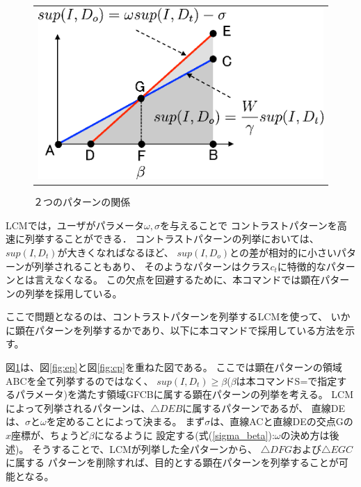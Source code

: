 \documentclass[a4paper]{jarticle}
\begin{document}
\begin{figure}[htbp]
\begin{center}
\begin{tabular}{c}
\begin{minipage}{0.3\hsize}
\begin{center}
\includegraphics[scale=0.5]{./epcp.eps}
\caption{２つのパターンの関係\label{fig:epcp}}
\end{center}
\end{minipage}


\end{tabular} 
\end{center}
\end{figure} 

LCMでは，ユーザがパラメータ$\omega, \sigma$を与えることで
コントラストパターンを高速に列挙することができる．
コントラストパターンの列挙においては、$sup(I,D_t)$が大きくなればなるほど、
$sup(I,D_o)$との差が相対的に小さいパターンが列挙されることもあり、
そのようなパターンはクラス$c_t$に特徴的なパターンとは言えなくなる。
この欠点を回避するために、本コマンドでは顕在パターンの列挙を採用している。

ここで問題となるのは、コントラストパターンを列挙するLCMを使って、
いかに顕在パターンを列挙するかであり、以下に本コマンドで採用している方法を示す。

図\ref{fig:epcp}は、図\ref{fig:ep}と図\ref{fig:cp}を重ねた図である。
ここでは顕在パターンの領域ABCを全て列挙するのではなく、
$sup(I,D_t)\ge\beta$($\beta$は本コマンドS=で指定するパラメータ)を満たす領域GFCBに属する顕在パターンの列挙を考える。
LCMによって列挙されるパターンは、$\triangle{DEB}$に属するパターンであるが、
直線DEは、$\sigma$と$\omega$を定めることによって決まる。
まず$\sigma$は、直線ACと直線DEの交点Gの$x$座標が、ちょうど$\beta$になるように
設定する(式(\ref{sigma_beta}):$\omega$の決め方は後述)。
そうすることで、LCMが列挙した全パターンから、
$\triangle{DFG}$および$\triangle{EGC}$に属する
パターンを削除すれば、目的とする顕在パターンを列挙することが可能となる。
\end{document}
